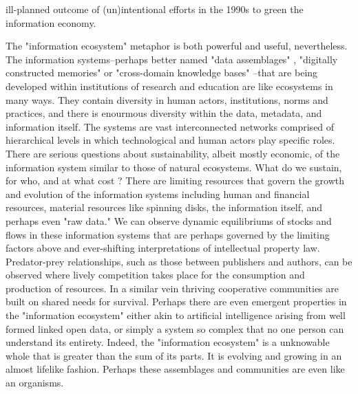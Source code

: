 ill-planned outcome of (un)intentional efforts in the 1990s to green the information economy.

The "information ecosystem" metaphor is both powerful and useful, nevertheless. The information systems--perhaps better named "data assemblages" \citep{kitchin_2014}, "digitally constructed memories" or "cross-domain knowledge bases" \citep{baker_2007}--that are being developed within institutions of research and education are like ecosystems in many ways. They contain diversity in human actors, institutions, norms and practices, and there is enourmous diversity within the data, metadata, and information itself. The systems are vast interconnected networks comprised of hierarchical levels in which technological and human actors play specific roles. There are serious questions about sustainability, albeit mostly economic, of the information system similar to those of natural ecosystems. What do we sustain, for who, and at what cost \citep[cf.][especially ch. 10]{liverman_2004,kitchin_2014}? There are limiting resources that govern the growth and evolution of the information systems including human and financial resources, material resources like spinning disks, the information itself, and perhaps even "raw data." We can observe dynamic equilibriums of stocks and flows in these information systems that are perhaps governed by the limiting factors above and ever-shifting interpretations of intellectual property law. Predator-prey relationships, such as those between publishers and authors, can be observed where lively competition takes place for the consumption and production of resources. In a similar vein thriving cooperative communities are built on shared needs for survival. Perhaps there are even emergent properties in the "information ecosystem" either akin to artificial intelligence arising from well formed linked open data, or simply a system so complex that no one person can understand its entirety. Indeed, the "information ecosystem" is a unknowable whole that is greater than the sum of its parts. It is evolving and growing in an almost lifelike fashion. Perhaps these assemblages and communities are even like an organisms.

